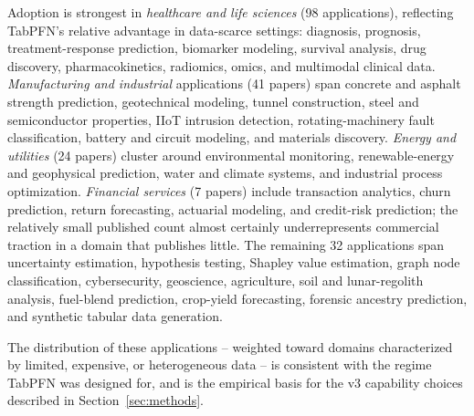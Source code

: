 Adoption is strongest in \textit{healthcare and life sciences} (98 applications), reflecting TabPFN's relative advantage in data-scarce settings: diagnosis, prognosis, treatment-response prediction, biomarker modeling, survival analysis, drug discovery, pharmacokinetics, radiomics, omics, and multimodal clinical data. \textit{Manufacturing and industrial} applications (41 papers) span concrete and asphalt strength prediction, geotechnical modeling, tunnel construction, steel and semiconductor properties, IIoT intrusion detection, rotating-machinery fault classification, battery and circuit modeling, and materials discovery. \textit{Energy and utilities} (24 papers) cluster around environmental monitoring, renewable-energy and geophysical prediction, water and climate systems, and industrial process optimization. \textit{Financial services} (7 papers) include transaction analytics, churn prediction, return forecasting, actuarial modeling, and credit-risk prediction; the relatively small published count almost certainly underrepresents commercial traction in a domain that publishes little. The remaining 32 applications span uncertainty estimation, hypothesis testing, Shapley value estimation, graph node classification, cybersecurity, geoscience, agriculture, soil and lunar-regolith analysis, fuel-blend prediction, crop-yield forecasting, forensic ancestry prediction, and synthetic tabular data generation.

The distribution of these applications -- weighted toward domains characterized by limited, expensive, or heterogeneous data -- is consistent with the regime TabPFN was designed for, and is the empirical basis for the v3 capability choices described in Section~\ref{sec:methods}.
